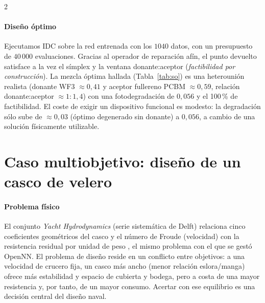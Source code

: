 \documentclass[5p,times,authoryear]{sciarticle}
\begin{document}
\begin{multicols}{2}
\paragraph{Diseño óptimo} Ejecutamos IDC sobre la red entrenada con los
$1040$ datos, con un presupuesto de $40\,000$ evaluaciones. Gracias al
operador de reparación afín, el punto devuelto satisface a la vez el símplex
y la ventana donante:aceptor (\emph{factibilidad por construcción}). La
mezcla óptima hallada
(Tabla~\ref{tab:so}) es una heterounión realista (donante WF3
$\approx\!0{,}41$ y aceptor fullereno PCBM $\approx\!0{,}59$, relación
donante:aceptor $\approx\!1{:}1{,}4$) con una fotodegradación de $0{,}056$ y
el 100\,\% de factibilidad. El coste de exigir un dispositivo funcional es
modesto: la degradación sólo sube de $\approx\!0{,}03$ (óptimo degenerado
sin donante) a $0{,}056$, a cambio de una solución físicamente utilizable.

\begin{table}[H]
\centering
\caption{Caso \texttt{photo\_wf3}: diseño óptimo hallado por IDC.}
\label{tab:so}

\end{table}

\section{Caso multiobjetivo: diseño de un casco de velero}
\label{sec:mo}
\paragraph{Problema físico} El conjunto \emph{Yacht Hydrodynamics} (serie
sistemática de Delft) relaciona cinco coeficientes geométricos del casco y
el número de Froude (velocidad) con la resistencia residual por unidad de
peso \citep{OrtigosaLopez2007}, el mismo problema con el que se gestó
OpenNN. El problema de diseño reside en un conflicto entre objetivos: a una
velocidad de crucero fija, un casco más ancho (menor relación eslora/manga)
ofrece más estabilidad y espacio de cubierta y bodega, pero a costa de una
mayor resistencia y, por tanto, de un mayor consumo. Acertar con ese
equilibrio es una decisión central del diseño naval.


\end{multicols}
\end{document}
